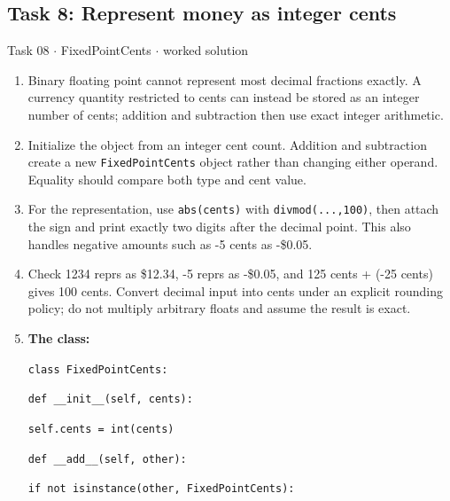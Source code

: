 \documentclass[11pt]{article}
\begin{document}
\begin{keepsection}\subsection{Task 8: Represent money as integer cents}

\begin{workedbox}{Task 08 \ensuremath{\cdot} FixedPointCents \ensuremath{\cdot} worked solution}
\begin{enumerate}
\item Binary floating point cannot represent most decimal fractions exactly. A currency quantity restricted to cents can instead be stored as an integer number of cents; addition and subtraction then use exact integer arithmetic.
\item Initialize the object from an integer cent count. Addition and subtraction create a new \texttt{FixedPointCents} object rather than changing either operand. Equality should compare both type and cent value.
\item For the representation, use \texttt{abs(cents)} with \texttt{divmod(...,100)}, then attach the sign and print exactly two digits after the decimal point. This also handles negative amounts such as -5 cents as -\$0.05.
\item Check 1234 reprs as \$12.34, -5 reprs as -\$0.05, and 125 cents + (-25 cents) gives 100 cents. Convert decimal input into cents under an explicit rounding policy; do not multiply arbitrary floats and assume the result is exact.
\item {}
\textbf{The class:}
\begin{tcolorbox}[colback=Paperblue,colframe=Paperblue,boxrule=0pt,arc=0pt,left=7pt,right=7pt,top=5pt,bottom=5pt]\small\sloppy
\noindent\hspace*{0em}\texttt{class FixedPointCents:}\par
\noindent\hspace*{1em}\texttt{def \_\_init\_\_(self, cents):}\par
\noindent\hspace*{3em}\texttt{self.cents = int(cents)}\par
\noindent\hspace*{0em}\texttt{}\par
\noindent\hspace*{1em}\texttt{def \_\_add\_\_(self, other):}\par
\noindent\hspace*{3em}\texttt{if not isinstance(other, FixedPointCents):}\par

\end{tcolorbox}
\end{enumerate}
\end{workedbox}
\end{keepsection}
\end{document}
